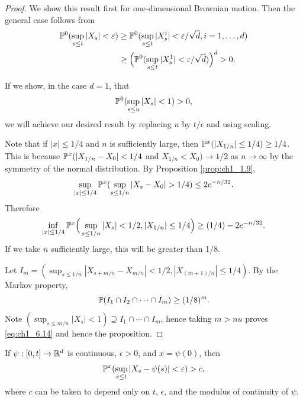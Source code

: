 \begin{proof}
We show this result first for one-dimensional Brownian motion. Then the general case follows from
\begin{align*}
    \P^0(\sup_{s\leq t} |X_s| < \epsilon) &\geq \P^0(\sup_{s\leq t} |X_s^i| < \epsilon/\sqrt{d}, i = 1,\ldots,d) \\
    &\geq \Big(\P^0(\sup_{s\leq t} |X_s^1| < \epsilon/\sqrt{d})\Big)^d > 0.
\end{align*}

If we show, in the case $d = 1$, that
\begin{equation}\label{eq:ch1_6.14}
    \P^0(\sup_{s\leq u} |X_s| < 1) > 0,
\end{equation}
we will achieve our desired result by replacing $u$ by $t/\epsilon$ and using scaling.

Note that if $|x| \leq 1/4$ and $n$ is sufficiently large, then $\P^x(|X_{1/n}| \leq 1/4) \geq 1/4$. This is because $\P^x(|X_{1/n} - X_0| < 1/4$ and $X_{1/n} < X_0) \to 1/2$ as $n \to \infty$ by the symmetry of the normal distribution. By Proposition \ref{prop:ch1_1.9},
\mpagebreak
\[
    \sup_{|x|\leq 1/4} \P^x(\sup_{s\leq 1/n} |X_s - X_0| > 1/4) \leq 2e^{-n/32}.
\]
Therefore
\[
    \inf_{|x|\leq 1/4} \P^x\Big(\sup_{s\leq 1/n} |X_s| < 1/2, |X_{1/n}| \leq 1/4\Big) \geq (1/4) - 2e^{-n/32}.
\]
If we take $n$ sufficiently large, this will be greater than 1/8.

Let $I_m = (\sup_{s\leq 1/n} |X_{s+m/n} - X_{m/n}| < 1/2, |X_{(m+1)/n}| \leq 1/4)$. By the Markov property,
\[
    \P(I_1 \cap I_2 \cap \cdots \cap I_m) \geq (1/8)^m.
\]
Note $(\sup_{s\leq m/n} |X_s| < 1) \supseteq I_1 \cap \cdots \cap I_m$, hence taking $m > nu$ proves \eqref{eq:ch1_6.14} and hence the proposition.
\end{proof}

\begin{theorem}\label{thm:ch1_6.6}
If $\psi : [0,t] \to \R^d$ is continuous, $\epsilon > 0$, and $x = \psi(0)$, then
\[
    \P^x(\sup_{s\leq t} |X_s - \psi(s)| < \epsilon) > c,
\]
where $c$ can be taken to depend only on $t$, $\epsilon$, and the modulus of continuity of $\psi$.
\end{theorem}

